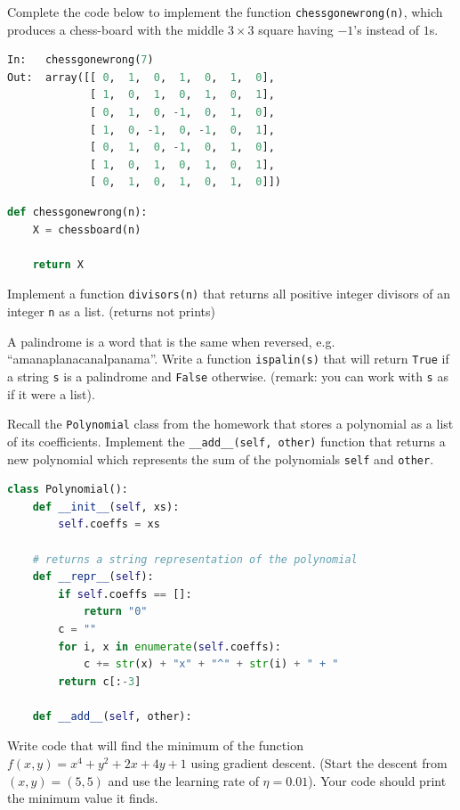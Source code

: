 \documentclass[addpoints,12pt]{exam}
\newcommand{\code}[1]{{\texttt{#1}}}
\begin{document}
\begin{questions}
\vfill

Complete the code below to implement the function \code{chessgonewrong(n)}, which produces a chess-board with the middle $3\times 3$ square having $-1$'s instead of $1$s.
\begin{lstlisting}[language=python]
In:   chessgonewrong(7) 
Out:  array([[ 0,  1,  0,  1,  0,  1,  0],
             [ 1,  0,  1,  0,  1,  0,  1],
             [ 0,  1,  0, -1,  0,  1,  0],
             [ 1,  0, -1,  0, -1,  0,  1],
             [ 0,  1,  0, -1,  0,  1,  0],
             [ 1,  0,  1,  0,  1,  0,  1],
             [ 0,  1,  0,  1,  0,  1,  0]])
\end{lstlisting}

\begin{lstlisting}[language=python]
def chessgonewrong(n):
    X = chessboard(n)

    return X
\end{lstlisting}
\vfill


\newpage
\question[20] Implement a function \code{divisors(n)} that returns all positive integer divisors of an integer \code{n} as a list. (returns not prints)

\newpage
\question[20] A palindrome is a word that is the same when reversed, e.g. ``amanaplanacanalpanama''. Write a function \code{ispalin(s)} that will return \code{True} if a string \code{s} is a palindrome and \code{False} otherwise. (remark: you can work with \code{s} as if it were a list). 



\newpage
\question[20] Recall the \code{Polynomial} class from the homework that stores a polynomial as a list of its coefficients. Implement the \code{\_\_add\_\_(self, other)} function that returns a new polynomial which represents the sum of the polynomials \code{self} and \code{other}.  

\begin{lstlisting}[language=python]
class Polynomial():
    def __init__(self, xs):
        self.coeffs = xs
   
    # returns a string representation of the polynomial
    def __repr__(self):
        if self.coeffs == []:
            return "0"
        c = ""
        for i, x in enumerate(self.coeffs):
            c += str(x) + "x" + "^" + str(i) + " + "
        return c[:-3]
    
    def __add__(self, other):
\end{lstlisting}

\newpage
\question[20] Write code that will find the minimum of the function $f(x,y) = x^4 + y^2 + 2x + 4y + 1$ using gradient descent. (Start the descent from $(x,y) = (5,5)$ and use the learning rate of $\eta = 0.01$). Your code should print the minimum value it finds. 


\end{questions}
\end{document}
